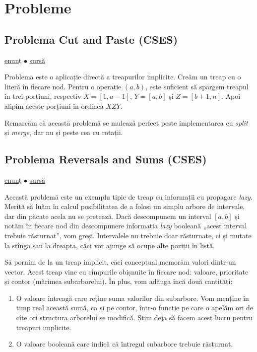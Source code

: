 \documentclass[../main.tex]{subfiles}
\begin{document}
\section{Probleme}

\subsection{Problema Cut and Paste (CSES)}
\label{problem:cut-and-paste}

\href{https://cses.fi/problemset/task/2072}{enunț}
$\bullet$
\hyperref[code:cut-and-paste]{sursă}

Problema este o aplicație directă a treapurilor implicite. Creăm un treap cu o literă în fiecare nod. Pentru o operație $(a, b)$, este suficient să spargem treapul în trei porțiuni, respectiv $X = [1, a-1]$, $Y = [a, b]$ și $Z = [b + 1, n]$. Apoi alipim aceste porțiuni în ordinea $XZY$.

Remarcăm că această problemă se mulează perfect peste implementarea cu \textit{split} și \textit{merge}, dar nu și peste cea cu rotații.

\subsection{Problema Reversals and Sums (CSES)}
\label{problem:reversals-and-sums}

\href{https://cses.fi/problemset/task/2074}{enunț}
$\bullet$
\hyperref[code:reversals-and-sums]{sursă}

Această problemă este un exemplu tipic de treap cu informații cu propagare \textit{lazy}. Merită să luăm în calcul posibilitatea de a folosi un simplu arbore de intervale, dar din păcate acela nu se pretează. Dacă descompunem un interval $[a,b]$ și notăm în fiecare nod din descompunere informația \textit{lazy} booleană „acest interval trebuie răsturnat”, vom greși. Intervalele nu trebuie doar răsturnate, ci și mutate la stînga sau la dreapta, căci vor ajunge să ocupe alte poziții în listă.

Să pornim de la un treap implicit, căci conceptual memorăm valori dintr-un vector. Acest treap vine cu cîmpurile obișnuite în fiecare nod: valoare, prioritate și contor (mărimea subarborelui). În plus, vom adăuga încă două cantități:

\begin{enumerate}
  \item O valoare întreagă  care reține suma valorilor din subarbore. Vom menține în timp real această sumă, ca și pe contor, într-o funcție  pe care o apelăm ori de cîte ori structura arborelui se modifică. Știm deja să facem acest lucru pentru treapuri implicite.

  \item O valoare booleană  care indică că întregul subarbore trebuie răsturnat.
\end{enumerate}
\end{document}
